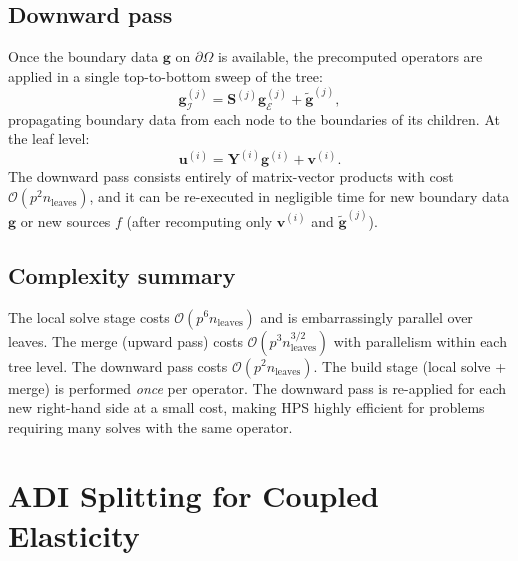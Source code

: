 \documentclass[hidelinks,onefignum,onetabnum]{siamart251216}
\newcommand{\dOmega}{\partial\Omega}
\begin{document}
\subsection{Downward pass}

Once the boundary data $\mathbf{g}$ on $\dOmega$ is available, the precomputed
operators are applied in a single top-to-bottom sweep of the tree:
\begin{equation}
  \mathbf{g}^{(j)}_\mathcal{I} = \mathbf{S}^{(j)} \mathbf{g}^{(j)}_\mathcal{E}
  + \tilde{\mathbf{g}}^{(j)},
\end{equation}
propagating boundary data from each node to the boundaries of its children.
At the leaf level:
\begin{equation}
  \mathbf{u}^{(i)} = \mathbf{Y}^{(i)} \mathbf{g}^{(i)} + \mathbf{v}^{(i)}.
\end{equation}
The downward pass consists entirely of matrix-vector products with cost
$\mathcal{O}(p^2 n_\text{leaves})$, and it can be re-executed in negligible time
for new boundary data $\mathbf{g}$ or new sources $f$ (after recomputing only $\mathbf{v}^{(i)}$
and $\tilde{\mathbf{g}}^{(j)}$).

\subsection{Complexity summary}

The local solve stage costs $\mathcal{O}(p^6 n_\text{leaves})$ and is embarrassingly parallel over leaves.
The merge (upward pass) costs $\mathcal{O}(p^3 n_\text{leaves}^{3/2})$ with parallelism within each tree level.
The downward pass costs $\mathcal{O}(p^2 n_\text{leaves})$.
The build stage (local solve + merge) is performed \emph{once} per operator.
The downward pass is re-applied for each new right-hand side at a small cost, making
HPS highly efficient for problems requiring many solves with the same operator.

\section{ADI Splitting for Coupled Elasticity}
\label{sec:gs}
\end{document}
